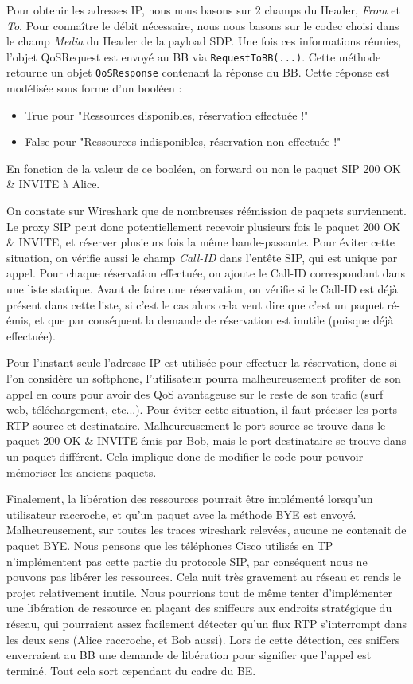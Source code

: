 \documentclass[a4paper,11pt]{article}
\begin{document}
Pour obtenir les adresses IP, nous nous basons sur 2 champs du Header, \emph{From}  et \emph{To}. Pour connaître le débit nécessaire, nous nous basons sur le codec choisi dans le champ \emph{Media} du Header de la payload SDP. Une fois ces informations réunies, l’objet QoSRequest est envoyé au BB via \texttt{RequestToBB(...)}. Cette méthode retourne un objet \texttt{QoSResponse} contenant la réponse du BB. Cette réponse est modélisée sous forme d’un booléen :

\begin{itemize}
    \item True pour "Ressources disponibles, réservation effectuée !"
    \item False pour "Ressources indisponibles, réservation non-effectuée !"
\end{itemize}


En fonction de la valeur de ce booléen, on forward ou non le paquet SIP 200 OK \& INVITE à Alice.

On constate sur Wireshark que de nombreuses réémission de paquets surviennent. Le proxy SIP peut donc potentiellement recevoir plusieurs fois le paquet 200 OK \& INVITE, et réserver plusieurs fois la même bande-passante. Pour éviter cette situation, on vérifie aussi le champ \emph{Call-ID} dans l'entête SIP, qui est unique par appel. Pour chaque réservation effectuée, on ajoute le Call-ID correspondant dans une liste statique. Avant de faire une réservation, on vérifie si le Call-ID est déjà présent dans cette liste, si c’est le cas alors cela veut dire que c’est un paquet ré-émis, et que par conséquent la demande de réservation est inutile (puisque déjà effectuée).    

Pour l’instant seule l’adresse IP est utilisée pour effectuer la réservation, donc si l’on considère un softphone, l’utilisateur pourra malheureusement profiter de son appel en cours pour avoir des QoS avantageuse sur le reste de son trafic (surf web, téléchargement, etc...). Pour éviter cette situation, il faut préciser les ports RTP source et destinataire. Malheureusement le port source se trouve dans le paquet 200 OK \& INVITE émis par Bob, mais le port destinataire se trouve dans un paquet différent. Cela implique donc de modifier le code pour pouvoir mémoriser les anciens paquets.

Finalement, la libération des ressources pourrait être implémenté lorsqu’un utilisateur raccroche, et qu’un paquet avec la méthode BYE est envoyé. Malheureusement, sur toutes les traces wireshark relevées, aucune ne contenait de paquet BYE. Nous pensons que les téléphones Cisco utilisés en TP n'implémentent pas cette partie du protocole SIP, par conséquent nous ne pouvons pas libérer les ressources. Cela nuit très gravement au réseau et rends le projet relativement inutile. Nous pourrions tout de même tenter d’implémenter une libération de ressource en plaçant des sniffeurs aux endroits stratégique du réseau, qui pourraient assez facilement détecter qu’un flux RTP s’interrompt dans les deux sens (Alice raccroche, et Bob aussi). Lors de cette détection, ces sniffers enverraient au BB une demande de libération pour signifier que l’appel est terminé. Tout cela sort cependant du cadre du BE. 
\end{document}
